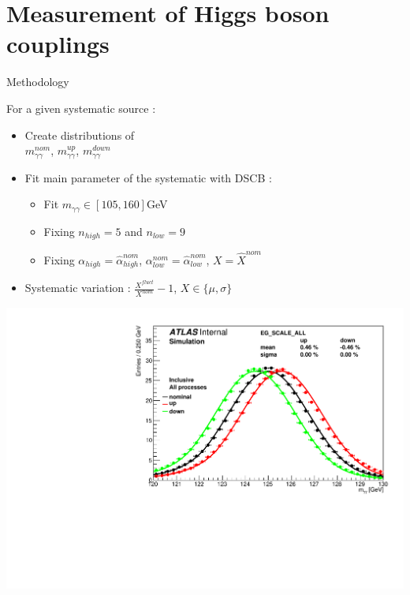 \section{Measurement of Higgs boson couplings}
\frame{\tableofcontents[currentsection]}


\begin{frame}{Methodology}
  \begin{minipage}{0.49\linewidth}
    For a given systematic source :
    \begin{itemize}
    \item Create distributions of \\ $m_{\gamma\gamma}^{nom}$, $m_{\gamma\gamma}^{up}$, $m_{\gamma \gamma}^{down}$
    \item Fit main parameter of the systematic with DSCB :
      \begin{itemize}
      \item Fit  $m_{\gamma\gamma}\in[105,160]$GeV
      \item Fixing $n_{high}=5$ and $n_{low}=9$
      \item Fixing $\alpha_{high}=\hat{\alpha}_{high}^{nom}$, $\alpha_{low}^{nom}=\hat{\alpha}_{low}^{nom}$, $X=\hat{X}^{nom}$
      \end{itemize}
      \item Systematic variation : $\frac{X^{fluct}}{X^{nom}}-1$, $X\in \{\mu , \sigma\}$
      \end{itemize}
    \end{minipage}
    \hfill
    \begin{minipage}{0.49\linewidth}
      \includegraphics[width=\linewidth]{Figures/h013_EG_SCALE_ALL_0.pdf}
    \end{minipage}
    \vfill
    

\end{frame}
